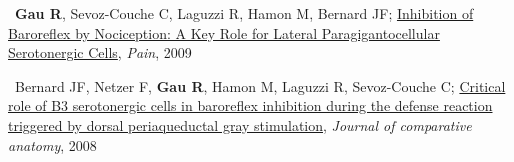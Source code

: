 \textbullet~\textbf{Gau R}, Sevoz-Couche C, Laguzzi R, Hamon M, Bernard JF; 
\href{https://osf.io/cqhvb/}{Inhibition of Baroreflex by Nociception: A Key Role for Lateral Paragigantocellular Serotonergic Cells}, 
\textit{Pain}, 
2009
\newline
{}

\textbullet~Bernard JF, Netzer F, \textbf{Gau R}, Hamon M, Laguzzi R, Sevoz-Couche C; 
\href{https://osf.io/rcvuj/}{Critical role of B3 serotonergic cells in baroreflex inhibition during the defense reaction triggered by dorsal periaqueductal gray stimulation}, 
\textit{Journal of comparative anatomy}, 
2008
\newline
{}
